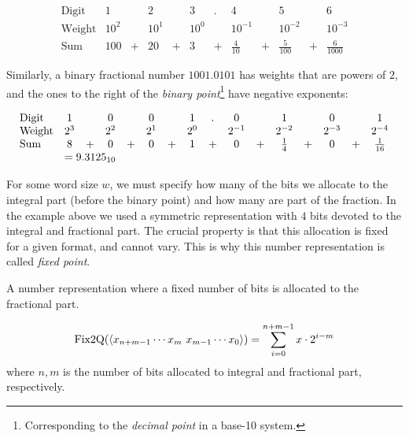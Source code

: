 \begin{example}
\[
  \begin{array}{lcccccccccccccc}
    \mathrm{Digit}   &1&&2&&3&.&4&&5&&6 \\
    \mathrm{Weight} & 10^{2} && 10^{1} && 10^{0} && 10^{-1} && 10^{-2} && 10^{-3} \\
    \mathrm{Sum} & 100 &+& 20 &+& 3 &+& \frac{4}{10} &+& \frac{5}{100} &+& \frac{6}{1000}
  \end{array}
\]
\end{example}
Similarly, a binary fractional number $1001.0101$ has weights that are
powers of $2$, and the ones to the right of the \emph{binary
  point}\footnote{Corresponding to the \emph{decimal point} in a
  base-10 system.} have negative exponents:
\begin{example}
\[
  \begin{array}{lcccccccccccccccc}
    \mathrm{Digit}   &1&&0&&0&&1&.&0&&1&&0&&1 \\
    \mathrm{Weight} & 2^{3} && 2^{2} && 2^{1} && 2^{0} && 2^{-1} && 2^{-2} && 2^{-3} && 2^{-4} \\                                                                          \mathrm{Sum} & 8 &+& 0 &+& 0 &+& 1 &+& 0 &+& \frac{1}{4} &+& 0 &+& \frac{1}{16} \\
    &\multicolumn{8}{l}{= 9.3125_{10}}
  \end{array}
\]
\end{example}

For some word size $w$, we must specify how many of the bits we
allocate to the integral part (before the binary point) and how many
are part of the fraction.  In the example above we used a symmetric
representation with $4$ bits devoted to the integral and fractional
part.  The crucial property is that this allocation is fixed for a
given format, and cannot vary.  This is why this number representation
is called \emph{fixed point}.

\begin{definition}
  A number representation where a fixed number of bits is allocated to
  the fractional part.
\end{definition}

\begin{definition}
  \[
    \mathrm{Fix2Q}(\langle x_{n+m-1}\cdots x_{m}~x_{m-1}\cdots x_{0} \rangle) =
    \sum_{i=0}^{n+m-1} x \cdot 2^{i-m}
  \]
  where $n,m$ is the number of bits allocated to integral and
  fractional part, respectively.
  \label{def:fx2Q}
\end{definition}

